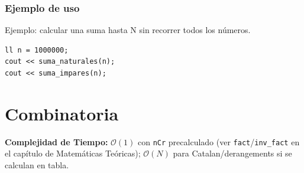 \documentclass[10pt,twocolumn,letterpaper]{report}
\begin{document}
\subsubsection*{Ejemplo de uso}
Ejemplo: calcular una suma hasta N sin recorrer todos los números.
\begin{lstlisting}
ll n = 1000000;
cout << suma_naturales(n);
cout << suma_impares(n);
\end{lstlisting}


\section{Combinatoria}
\textbf{Complejidad de Tiempo:} $\mathcal{O}(1)$ con \texttt{nCr} precalculado (ver \texttt{fact}/\texttt{inv\_fact} en el capítulo de Matemáticas Teóricas); $\mathcal{O}(N)$ para Catalan/derangements si se calculan en tabla.
\end{document}
